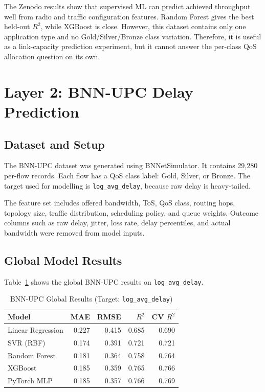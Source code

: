 \documentclass[a4paper,12pt]{Classes/RoboticsLaTeX}
\begin{document}
The Zenodo results show that supervised ML can predict achieved throughput well from radio and traffic configuration features. Random Forest gives the best held-out $R^2$, while XGBoost is close. However, this dataset contains only one application type and no Gold/Silver/Bronze class variation. Therefore, it is useful as a link-capacity prediction experiment, but it cannot answer the per-class QoS allocation question on its own.

\section{Layer 2: BNN-UPC Delay Prediction}

\subsection{Dataset and Setup}

The BNN-UPC dataset was generated using BNNetSimulator. It contains 29,280 per-flow records. Each flow has a QoS class label: Gold, Silver, or Bronze. The target used for modelling is \texttt{log\_avg\_delay}, because raw delay is heavy-tailed.

The feature set includes offered bandwidth, ToS, QoS class, routing hops, topology size, traffic distribution, scheduling policy, and queue weights. Outcome columns such as raw delay, jitter, loss rate, delay percentiles, and actual bandwidth were removed from model inputs.

\subsection{Global Model Results}

Table~\ref{tab:bnnupc_global_results} shows the global BNN-UPC results on \texttt{log\_avg\_delay}.

\begin{table}[H]
\centering
\caption{BNN-UPC Global Results (Target: \texttt{log\_avg\_delay})}
\label{tab:bnnupc_global_results}
\begin{tabular}{|l|r|r|r|r|}
\hline
\textbf{Model} & \textbf{MAE} & \textbf{RMSE} & \textbf{$R^2$} & \textbf{CV $R^2$} \\
\hline
Linear Regression & 0.227 & 0.415 & 0.685 & 0.690 \\
\hline
SVR (RBF) & 0.174 & 0.391 & 0.721 & 0.721 \\
\hline
Random Forest & 0.181 & 0.364 & 0.758 & 0.764 \\
\hline
XGBoost & 0.185 & 0.359 & 0.765 & 0.766 \\
\hline
PyTorch MLP & 0.185 & 0.357 & 0.766 & 0.769 \\
\hline
\end{tabular}
\end{table}
\end{document}
